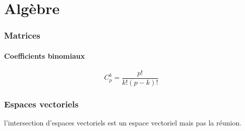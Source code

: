 \documentclass[../main.tex]{subfile}
\begin{document}
\part{Algèbre}

\section{Matrices}

\subsection{Coefficients binomiaux}

$$C_p^k = \frac{p!}{k!(p-k)!}$$


\section{Espaces vectoriels}

l'intersection d'espaces vectoriels est un espace vectoriel mais pas la réunion.
\end{document}
